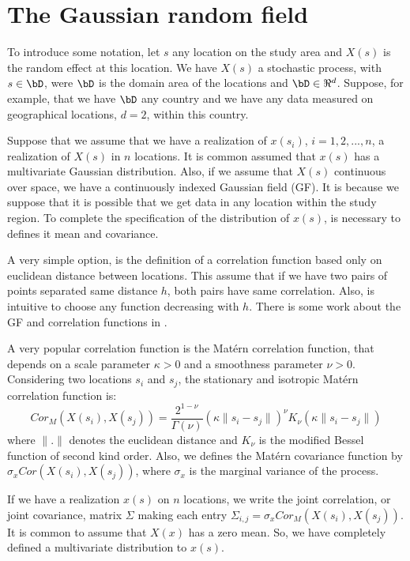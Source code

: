 \section{The Gaussian random field}

To introduce some notation, let $s$ any 
location on the study area and $X(s)$ is 
the random effect at this location. 
We have $X(s)$ a stochastic process, with $s\in \bD$, 
were $\bD$ is the domain area of the locations 
and $\bD\in \Re^d$. 
Suppose, for example, that we have $\bD$ any country 
and we have any data measured on geographical 
locations, $d=2$, within this country. 

Suppose that we assume that we have a realization 
of $x(s_i)$, $i=1,2,...,n$, a realization of $X(s)$ 
in $n$ locations. It is common assumed that 
$x(s)$ has a multivariate Gaussian distribution. 
Also, if we assume that $X(s)$ continuous over space, 
we have a continuously indexed Gaussian field (GF). 
It is because we suppose that it is possible that 
we get data in any location within the study region. 
To complete the specification of the distribution of 
$x(s)$, is necessary to defines it mean and covariance. 

A very simple option, is the definition of a 
correlation function based only on euclidean 
distance between locations. 
This assume that if we have two pairs of 
points separated same distance $h$, both pairs 
have same correlation. 
Also, is intuitive to choose any function 
decreasing with $h$. 
There is some work about the GF and correlation 
functions in \cite{abrahamsen:1997}. 

A very popular correlation function is the 
Mat\'ern correlation function, that depends 
on a scale parameter $\kappa>0$ and a smoothness 
parameter $\nu>0$. 
Considering two locations $s_i$ and $s_j$, the 
stationary and isotropic Mat\'ern correlation function is: 
\begin{equation}
Cor_M(X(s_i), X(s_j)) = 
\frac{2^{1-\nu}}{\Gamma(\nu)}
(\kappa \parallel s_i - s_j\parallel)^\nu 
K_\nu(\kappa \parallel s_i - s_j \parallel)
\end{equation}
where $\parallel . \parallel$ denotes 
the euclidean distance and $K_\nu$ is the modified 
Bessel function of second kind order. 
Also, we defines the Mat\'ern covariance function 
by $\sigma_x Cor(X(s_i), X(s_j))$, where 
$\sigma_x$ is the marginal variance of the process. 

If we have a realization $x(s)$ on $n$ locations, 
we write the joint correlation, or joint covariance, 
matrix $\Sigma$ making each entry 
$\Sigma_{i,j} = \sigma_xCor_M(X(s_i), X(s_j))$. 
It is common to assume that $X(x)$ has a zero mean. 
So, we have completely defined a multivariate 
distribution to $x(s)$. 

